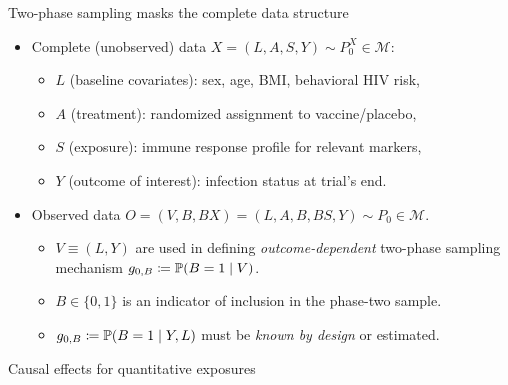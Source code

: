 \documentclass{beamer}
\begin{document}
\begin{frame}[c]{Two-phase sampling masks the complete data structure}

\begin{center}
\begin{itemize}
  \itemsep8pt
  \item Complete (unobserved) data $X = (L, A, S, Y) \sim P_0^X \in
    \mathcal{M}$:
    \begin{itemize}
      \itemsep4pt
      \item $L$ (baseline covariates): sex, age, BMI, behavioral HIV risk,
      \item $A$ (treatment): randomized assignment to vaccine/placebo,
      \item $S$ (exposure): immune response profile for relevant markers,
      \item $Y$ (outcome of interest): infection status at trial's end.
    \end{itemize}
  \item Observed data $O = (V, B, BX) = (L, A, B, BS, Y) \sim P_0 \in
    \mathcal{M}$.
    \begin{itemize}
      \itemsep4pt
      \item $V \equiv (L, Y)$ are used in defining \textit{outcome-dependent}
        two-phase sampling mechanism $g_{0,B} \coloneqq \mathbb{P}(B = 1 \mid V)$.
      \item $B \in \{0,1\}$ is an indicator of inclusion in the phase-two
        sample.
      \item $g_{0,B} \coloneqq \mathbb{P}(B = 1 \mid Y, L)$ must be \textit{known by
        design} or estimated.
    \end{itemize}
\end{itemize}
\end{center}


\end{frame}


\begin{frame}[standout]
  Causal effects for quantitative exposures
\end{frame}
\end{document}
